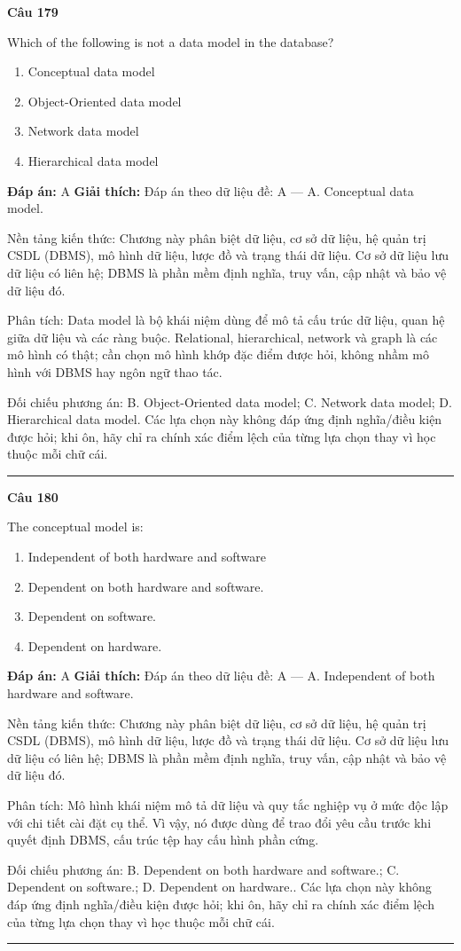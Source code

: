 \documentclass[11pt,a4paper]{article}
\newenvironment{question}[1]{%
  \par\vspace{1em}\noindent\textbf{\large Câu #1}\par\vspace{0.4em}
}{%
  \par\vspace{1em}\hrule\vspace{0.6em}
}
\newenvironment{choices}{%
  \begin{enumerate}[label=\textbf{\Alph*.},leftmargin=2.2em,itemsep=2pt,topsep=3pt]
}{%
  \end{enumerate}
}
\newcommand{\choice}{\item}
\begin{document}
\begin{question}{179}
Which of the following is not a data model in the database?
\begin{choices}
\choice Conceptual data model
\choice Object-Oriented data model
\choice Network data model
\choice Hierarchical data model
\end{choices}
\textbf{Đáp án:} A
\textbf{Giải thích:} Đáp án theo dữ liệu đề: A — A. Conceptual data model.

Nền tảng kiến thức: Chương này phân biệt dữ liệu, cơ sở dữ liệu, hệ quản trị CSDL (DBMS), mô hình dữ liệu, lược đồ và trạng thái dữ liệu. Cơ sở dữ liệu lưu dữ liệu có liên hệ; DBMS là phần mềm định nghĩa, truy vấn, cập nhật và bảo vệ dữ liệu đó.

Phân tích: Data model là bộ khái niệm dùng để mô tả cấu trúc dữ liệu, quan hệ giữa dữ liệu và các ràng buộc. Relational, hierarchical, network và graph là các mô hình có thật; cần chọn mô hình khớp đặc điểm được hỏi, không nhầm mô hình với DBMS hay ngôn ngữ thao tác.

Đối chiếu phương án: B. Object-Oriented data model; C. Network data model; D. Hierarchical data model. Các lựa chọn này không đáp ứng định nghĩa/điều kiện được hỏi; khi ôn, hãy chỉ ra chính xác điểm lệch của từng lựa chọn thay vì học thuộc mỗi chữ cái.
\end{question}

\begin{question}{180}
The conceptual model is:
\begin{choices}
\choice Independent of both hardware and software
\choice Dependent on both hardware and software.
\choice Dependent on software.
\choice Dependent on hardware.
\end{choices}
\textbf{Đáp án:} A
\textbf{Giải thích:} Đáp án theo dữ liệu đề: A — A. Independent of both hardware and software.

Nền tảng kiến thức: Chương này phân biệt dữ liệu, cơ sở dữ liệu, hệ quản trị CSDL (DBMS), mô hình dữ liệu, lược đồ và trạng thái dữ liệu. Cơ sở dữ liệu lưu dữ liệu có liên hệ; DBMS là phần mềm định nghĩa, truy vấn, cập nhật và bảo vệ dữ liệu đó.

Phân tích: Mô hình khái niệm mô tả dữ liệu và quy tắc nghiệp vụ ở mức độc lập với chi tiết cài đặt cụ thể. Vì vậy, nó được dùng để trao đổi yêu cầu trước khi quyết định DBMS, cấu trúc tệp hay cấu hình phần cứng.

Đối chiếu phương án: B. Dependent on both hardware and software.; C. Dependent on software.; D. Dependent on hardware.. Các lựa chọn này không đáp ứng định nghĩa/điều kiện được hỏi; khi ôn, hãy chỉ ra chính xác điểm lệch của từng lựa chọn thay vì học thuộc mỗi chữ cái.
\end{question}
\end{document}
